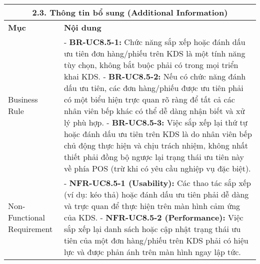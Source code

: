 \begin{longtable}{|m{4cm}|p{11cm}|}
\hline
\multicolumn{2}{|c|}{\textbf{2.3. Thông tin bổ sung (Additional Information)}} \\
\hline
\textbf{Mục} & \textbf{Nội dung} \\
\hline
Business Rule & - \textbf{BR-UC8.5-1:} Chức năng sắp xếp hoặc đánh dấu ưu tiên đơn hàng/phiếu trên KDS là một tính năng tùy chọn, không bắt buộc phải có trong mọi triển khai KDS. \newline - \textbf{BR-UC8.5-2:} Nếu có chức năng đánh dấu ưu tiên, các đơn hàng/phiếu được ưu tiên phải có một biểu hiện trực quan rõ ràng để tất cả các nhân viên bếp khác có thể dễ dàng nhận biết và xử lý phù hợp. \newline - \textbf{BR-UC8.5-3:} Việc sắp xếp lại thứ tự hoặc đánh dấu ưu tiên trên KDS là do nhân viên bếp chủ động thực hiện và chịu trách nhiệm, không nhất thiết phải đồng bộ ngược lại trạng thái ưu tiên này về phía POS (trừ khi có yêu cầu nghiệp vụ đặc biệt). \\
\hline
Non-Functional Requirement & - \textbf{NFR-UC8.5-1 (Usability):} Các thao tác sắp xếp (ví dụ: kéo thả) hoặc đánh dấu ưu tiên phải dễ dàng và trực quan để thực hiện trên màn hình cảm ứng của KDS. \newline - \textbf{NFR-UC8.5-2 (Performance):} Việc sắp xếp lại danh sách hoặc cập nhật trạng thái ưu tiên của một đơn hàng/phiếu trên KDS phải có hiệu lực và được phản ánh trên màn hình ngay lập tức. \\
\hline
\end{longtable}

